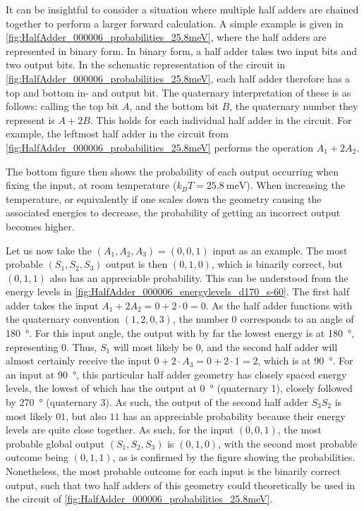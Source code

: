 \documentclass[11pt,a4paper,english,twoside]{article}
\begin{document}
It can be insightful to consider a situation where multiple half adders are chained together to perform a larger forward calculation. A simple example is given in \cref{fig:HalfAdder_000006_probabilities_25.8meV}, where the half adders are represented in binary form. In binary form, a half adder takes two input bits and two output bits. In the schematic representation of the circuit in \cref{fig:HalfAdder_000006_probabilities_25.8meV}, each half adder therefore has a top and bottom in- and output bit. The quaternary interpretation of these is as follows: calling the top bit $A$, and the bottom bit $B$, the quaternary number they represent is $A+2B$. This holds for each individual half adder in the circuit. For example, the leftmost half adder in the circuit from \cref{fig:HalfAdder_000006_probabilities_25.8meV} performs the operation $A_1+2A_2$. \par
The bottom figure then shows the probability of each output occurring when fixing the input, at room temperature ($k_B T=\SI{25.8}{\milli\electronvolt}$). When increasing the temperature, or equivalently if one scales down the geometry causing the associated energies to decrease, the probability of getting an incorrect output becomes higher. \par
Let us now take the $(A_1,A_2,A_3)=(0,0,1)$ input as an example. The most probable $(S_1,S_2,S_3)$ output is then $(0,1,0)$, which is binarily correct, but $(0,1,1)$ also has an appreciable probability. This can be understood from the energy levels in \cref{fig:HalfAdder_000006_energylevels_d170_s-60}. The first half adder takes the input $A_1 + 2A_2 = 0+2\cdot0=0$. As the half adder functions with the quaternary convention $(1,2,0,3)$, the number 0 corresponds to an angle of \SI{180}{\degree}. For this input angle, the output with by far the lowest energy is at \SI{180}{\degree}, representing 0. Thus, $S_1$ will most likely be 0, and the second half adder will almost certainly receive the input $0+2\cdot A_3=0+2\cdot1=2$, which is at \SI{90}{\degree}. For an input at \SI{90}{\degree}, this particular half adder geometry has closely spaced energy levels, the lowest of which has the output at \SI{0}{\degree} (quaternary 1), closely followed by \SI{270}{\degree} (quaternary 3). As such, the output of the second half adder $S_3 S_2$ is most likely $01$, but also $11$ has an appreciable probability because their energy levels are quite close together. As such, for the input $(0,0,1)$, the most probable global output $(S_1, S_2, S_3)$ is $(0,1,0)$, with the second most probable outcome being $(0,1,1)$, as is confirmed by the figure showing the probabilities. Nonetheless, the most probable outcome for each input is the binarily correct output, such that two half adders of this geometry could theoretically be used in the circuit of \cref{fig:HalfAdder_000006_probabilities_25.8meV}. \par
\end{document}
